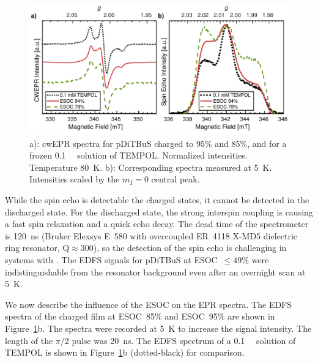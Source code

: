 \begin{figure}[ht]
\center
	\includegraphics[width=1\textwidth]{./pulse/figures/Figure_3.pdf}
	\caption{a): cwEPR spectra for pDiTBuS charged to 95\% and 85\%, and for a frozen 0.1~\si{\milli\Molar}  solution of TEMPOL. Normalized intensities. Temperature 80~K. b): Corresponding  spectra measured at 5~K. Intensities scaled by the $m_I=0$ central peak.}
	\label{fig:Figure_3}
\end{figure}


While the spin echo is  detectable  the charged states, it cannot be detected in the discharged state. For the discharged state, the strong interspin coupling is causing a fast spin relaxation and a quick echo decay. The dead time of the spectrometer is 120~ns (Bruker Elexsys E~580 with overcoupled ER~4118 X-MD5 dielectric ring resonator, Q$\approx$300), so the detection of the spin echo is challenging in  systems with . The EDFS signals for pDiTBuS at ESOC~$\leq49$\% were indistinguishable from the resonator background even after an overnight scan at 5~K.%

We now describe the influence of the ESOC on the EPR spectra. The EDFS spectra of the charged film at ESOC~85\% and ESOC~95\% are shown in Figure~\ref{fig:Figure_3}b. The spectra were recorded at 5~K to increase the signal intensity. The length of the $\pi/2$ pulse was 20~ns. The EDFS spectrum of a 0.1~\si{\milli\Molar}  solution of TEMPOL is shown in Figure~\ref{fig:Figure_3}b (dotted-black) for comparison.

